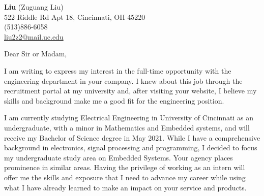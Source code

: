 \documentclass[11pt]{letter} %
\begin{document}

\begin{letter}
{\vspace{-15pt}} 


\begin{center}
\large \textbf{Liu} (Zuguang Liu) \\ %
522 Riddle Rd Apt 18, Cincinnati, OH 45220 \\ (513)886-6058  \\ \href{mailto:liu2z2@mail.uc.edu}{liu2z2@mail.uc.edu}%
\end{center} 


\signature{Liu (Zuguang Liu)} %


\opening{Dear Sir or Madam,} 
 
I am writing to express my interest in the full-time opportunity with the engineering department in your company. I knew about this job through the recruitment portal at my university and, after visiting your website, I believe my skills and background make me a good fit for the engineering position.  

I am currently studying Electrical Engineering in University of Cincinnati as an undergraduate, with a minor in Mathematics and Embedded systems, and will receive my Bachelor of Science degree in May 2021. While I have a comprehensive background in electronics, signal processing and programming, I decided to focus my undergraduate study area on Embedded Systems. Your agency places prominence in similar areas. Having the privilege of working as an intern will offer me the skills and exposure that I need to advance my career while using what I have already learned to make an impact on your service and products. 


\end{letter}
\end{document}

